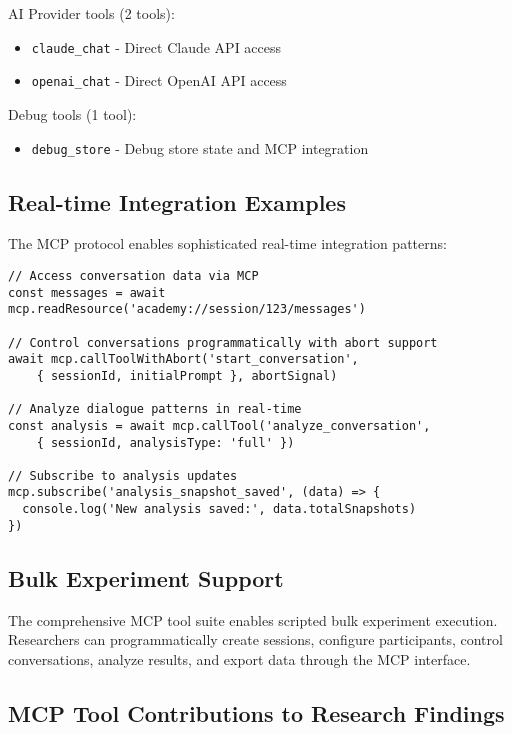 \documentclass[11pt,letterpaper]{article}
\begin{document}
AI Provider tools (2 tools):
\begin{itemize}
    \item \texttt{claude\_chat} - Direct Claude API access
    \item \texttt{openai\_chat} - Direct OpenAI API access
\end{itemize}

Debug tools (1 tool):
\begin{itemize}
    \item \texttt{debug\_store} - Debug store state and MCP integration
\end{itemize}

\subsection{Real-time Integration Examples}

The MCP protocol enables sophisticated real-time integration patterns:

\begin{verbatim}
// Access conversation data via MCP
const messages = await mcp.readResource('academy://session/123/messages')

// Control conversations programmatically with abort support
await mcp.callToolWithAbort('start_conversation', 
    { sessionId, initialPrompt }, abortSignal)

// Analyze dialogue patterns in real-time
const analysis = await mcp.callTool('analyze_conversation', 
    { sessionId, analysisType: 'full' })

// Subscribe to analysis updates
mcp.subscribe('analysis_snapshot_saved', (data) => {
  console.log('New analysis saved:', data.totalSnapshots)
})
\end{verbatim}

\subsection{Bulk Experiment Support}

The comprehensive MCP tool suite enables scripted bulk experiment execution. Researchers can programmatically create sessions, configure participants, control conversations, analyze results, and export data through the MCP interface. \subsection{MCP Tool Contributions to Research Findings}
\end{document}
